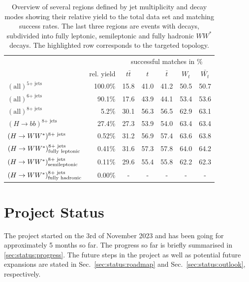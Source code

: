 \documentclass[bachelor,ngerman,english]{GAUBM}
\begin{document}
\begin{table}
    \centering
    \caption{Overview of several regions defined by jet multiplicity and decay modes showing their relative yield to the total data set and matching success rates. The last three regions are events with \HWW decays, subdivided into fully leptonic, semileptonic and fully hadronic $WW^*$ decays. The highlighted row corresponds to the targeted topology.}
    \begin{tabular}{l|r|c|c|c|c|c|}
        &&\multicolumn{5}{c|}{successful matches in \%}\\
        & rel. yield & $t\bar{t}$ & $t$ & $\bar{t}$ & $W_t$ & $\bar{W_t}$\\
        \hline
        $(\text{all})^{\text{5+ jets}}$  & 100.0\% & 15.8 & 41.0 & 41.2 & 50.5 & 50.7\\
        $(\text{all})^{\text{6+ jets}}$  & 90.1\% & 17.6 & 43.9 & 44.1 & 53.4 & 53.6\\
        $(\text{all})^{\text{8+ jets}}$  & 5.2\% & 30.1 & 56.3 & 56.5 & 62.9 & 63.1\\
        \hline
        $(H\rightarrow bb)^{\text{8+ jets}}$ & 27.4\% & 27.3 & 53.9 & 54.0 & 63.4 & 63.4\\
        $(\mbox{$H\rightarrow WW^*$})^{\text{8+ jets}}$ & 0.52\% & 31.2 & 56.9 & 57.4 & 63.6 & 63.8\\
        \hline
        $(\mbox{$H\rightarrow WW^*$})_{\text{fully leptonic}}^{\text{8+ jets}}$ & 0.41\% & 31.6 & 57.3 & 57.8 & 64.0 & 64.2\\
        \rowcolor{highlighter!40}
        $(\mbox{$H\rightarrow WW^*$})_{\text{semileptonic}}^{\text{8+ jets}}$ & 0.11\% & 29.6 & 55.4 & 55.8 & 62.2 & 62.3\\
        $(\mbox{$H\rightarrow WW^*$})_{\text{fully hadronic}}^{\text{8+ jets}}$ & 0.00\% & - & - & - & - & -\\
    \end{tabular}
    \label{tab:higgs_decay}
\end{table}


\chapter{Project Status}
\label{ch:status}
The project started on the 3rd of November 2023 and has been going for approximately 5 months so far. The progress so far is briefly summarised in \ref{sec:status:progress}. The future steps in the project as well as potential future expansions are stated in Sec.~\ref{sec:status:roadmap} and Sec.~\ref{sec:status:outlook}, respectively.  
\end{document}
